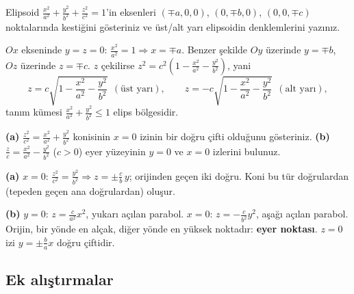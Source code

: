 \begin{soru}
Elipsoid $\frac{x^2}{a^2}+\frac{y^2}{b^2}+\frac{z^2}{c^2}=1$'in eksenleri $(\mp a,0,0)$, $(0,\mp b,0)$, $(0,0,\mp c)$ noktalarında kestiğini gösteriniz ve üst/alt yarı elipsoidin denklemlerini yazınız.
\end{soru}
\begin{cevap}
$Ox$ ekseninde $y=z=0$: $\frac{x^2}{a^2}=1\Rightarrow x=\mp a$. Benzer şekilde $Oy$ üzerinde $y=\mp b$, $Oz$ üzerinde $z=\mp c$.
$z$ çekilirse $z^2=c^2\left(1-\frac{x^2}{a^2}-\frac{y^2}{b^2}\right)$, yani
\[ z=c\sqrt{1-\frac{x^2}{a^2}-\frac{y^2}{b^2}}\ \ (\text{üst yarı}),\qquad z=-c\sqrt{1-\frac{x^2}{a^2}-\frac{y^2}{b^2}}\ \ (\text{alt yarı}), \]
tanım kümesi $\frac{x^2}{a^2}+\frac{y^2}{b^2}\le1$ elips bölgesidir.
\end{cevap}

\begin{soru}
\textbf{(a)} $\frac{z^2}{c^2}=\frac{x^2}{a^2}+\frac{y^2}{b^2}$ konisinin $x=0$ izinin bir doğru çifti olduğunu gösteriniz.
\textbf{(b)} $\frac zc=\frac{x^2}{a^2}-\frac{y^2}{b^2}$ ($c>0$) eyer yüzeyinin $y=0$ ve $x=0$ izlerini bulunuz.
\end{soru}
\begin{cevap}
\textbf{(a)} $x=0$: $\frac{z^2}{c^2}=\frac{y^2}{b^2}\Rightarrow z=\pm\frac cb\,y$; orijinden geçen iki doğru. Koni bu tür doğrulardan (tepeden geçen ana doğrulardan) oluşur.

\textbf{(b)} $y=0$: $z=\frac{c}{a^2}x^2$, yukarı açılan parabol. $x=0$: $z=-\frac{c}{b^2}y^2$, aşağı açılan parabol. Orijin, bir yönde en alçak, diğer yönde en yüksek noktadır: \textbf{eyer noktası}. $z=0$ izi $y=\pm\frac ba x$ doğru çiftidir.
\end{cevap}

\subsection{Ek alıştırmalar}

